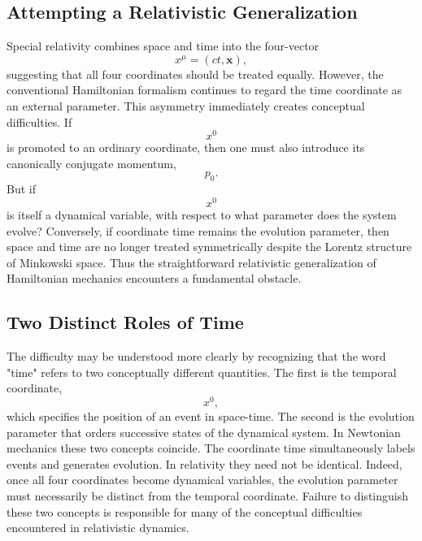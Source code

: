 \subsection{Attempting a Relativistic Generalization}
Special relativity combines space and time into the four-vector
\[x^\mu=(ct,\mathbf{x}),\]
suggesting that all four coordinates should be treated equally.
However, the conventional Hamiltonian formalism continues to regard the
time coordinate as an external parameter.
This asymmetry immediately creates conceptual difficulties.
If
\[x^0\]
is promoted to an ordinary coordinate, then one must also introduce its
canonically conjugate momentum,
\[p_0.\]
But if
\[x^0\]
is itself a dynamical variable, with respect to what parameter does the
system evolve?
Conversely, if coordinate time remains the evolution parameter, then
space and time are no longer treated symmetrically despite the Lorentz
structure of Minkowski space.
Thus the straightforward relativistic generalization of Hamiltonian
mechanics encounters a fundamental obstacle.
\subsection{Two Distinct Roles of Time}
The difficulty may be understood more clearly by recognizing that the
word "time" refers to two conceptually different quantities.
The first is the temporal coordinate,
\[x^0,\]
which specifies the position of an event in space-time.
The second is the evolution parameter that orders successive states of
the dynamical system.
In Newtonian mechanics these two concepts coincide.
The coordinate time simultaneously labels events and generates
evolution.
In relativity they need not be identical.
Indeed, once all four coordinates become dynamical variables, the
evolution parameter must necessarily be distinct from the temporal
coordinate.
Failure to distinguish these two concepts is responsible for many of the
conceptual difficulties encountered in relativistic dynamics.
